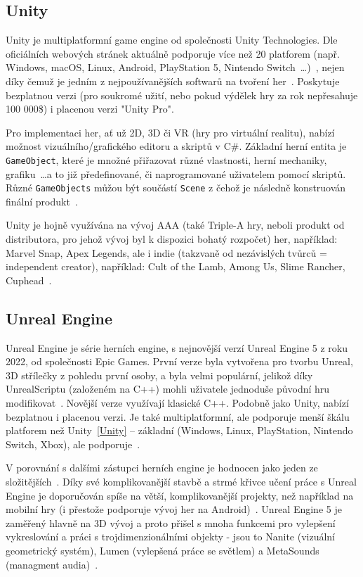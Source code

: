 \subsection*{Unity}\label{Unity}
Unity je multiplatformní game engine od společnosti Unity Technologies. Dle oficiálních webových stránek aktuálně podporuje více než 20 platforem (např. Windows, macOS, Linux, Android, PlayStation 5, Nintendo Switch~\ldots)~\cite{unity_website}, nejen díky čemuž je jedním z nejpoužívanějších softwarů na tvoření her~\cite{arnia_unity}. Poskytuje bezplatnou verzi (pro soukromé užití, nebo pokud výdělek hry za rok nepřesahuje 100 000\$) i placenou verzi "Unity Pro". 

Pro implementaci her, ať už 2D, 3D či VR (hry pro virtuální realitu), nabízí možnost vizuálního/grafického editoru a skriptů v C\#. Základní herní entita je \verb|GameObject|, které je množné přiřazovat různé vlastnosti, herní mechaniky, grafiku~\ldots a to již předefinované, či naprogramované uživatelem pomocí skriptů. Různé \verb|GameObjects| můžou být součástí \verb|Scene| z čehož je následně konstruován finální produkt~\cite{hocking2015unity}.

Unity je hojně využívána na vývoj AAA (také Triple-A hry, neboli produkt od distributora, pro jehož vývoj byl k dispozici bohatý rozpočet) her, například: Marvel Snap, Apex Legends, ale i indie (takzvaně od nezávislých tvůrců = independent creator), například: Cult of the Lamb, Among Us, Slime Rancher, Cuphead~\cite{unity_case-study}.

\subsection*{Unreal Engine}\label{Unreal Engine}
Unreal Engine je série herních engine, s nejnovější verzí Unreal Engine 5 z roku 2022, od společnosti Epic Games. První verze byla vytvořena pro tvorbu Unreal, 3D střílečky z pohledu první osoby, a byla velmi populární, jelikož díky UnrealScriptu (založeném na C++) mohli uživatele jednoduše původní hru modifikovat~\cite{sanders2016introduction}. Novější verze využívají klasické C++. Podobně jako Unity, nabízí bezplatnou i placenou verzi. Je také multiplatformní, ale podporuje menší škálu platforem než Unity~\ref{Unity} -- základní (Windows, Linux, PlayStation, Nintendo Switch, Xbox), ale podporuje~\cite{Unreal_Engine_FAQ}.

V porovnání s dalšími zástupci herních engine je hodnocen jako jeden ze složitějších~\cite{Kevuru_Games_Unreal-Unity}. Díky své komplikovanější stavbě a strmé křivce učení práce s Unreal Engine je doporučován spíše na větší, komplikovanější projekty, než například na mobilní hry (i přestože podporuje vývoj her na Android)~\cite{cap_porovnani}. Unreal Engine 5 je zaměřený hlavně na 3D vývoj a proto přišel s mnoha funkcemi pro vylepšení vykreslování a práci s trojdimenzionálními objekty - jsou to Nanite (vizuální geometrický systém), Lumen (vylepšená práce se světlem) a MetaSounds (managment audia)~\cite{UnrealEngine5}.

